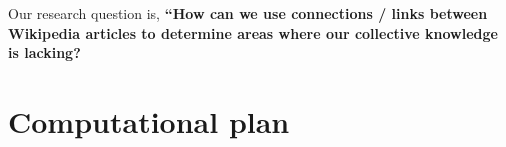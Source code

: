 \documentclass[fontsize=12pt]{article}
\begin{document}
\begin{multicols}{2}

    Our research question is, \textbf{``How can we use connections / links between Wikipedia articles to determine areas where our collective knowledge is lacking?}




    \section{Computational plan}  %



\end{multicols}
\end{document}
